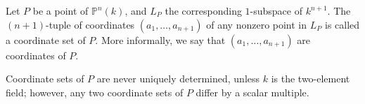 Let $P$ be a point of $\mathbb{P}^n(k)$, and $L_P$ the corresponding $1$-subspace of $k^{n+1}$. The $(n+1)$-tuple of coordinates $(a_1, \ldots, a_{n+1})$ of any nonzero point in $L_P$ is called a coordinate set of $P$. More informally, we say that $(a_1, \ldots, a_{n+1})$ are coordinates of $P$.

Coordinate sets of $P$ are never uniquely determined, unless $k$ is the two-element field; however, any two coordinate sets of $P$ differ by a scalar multiple.
